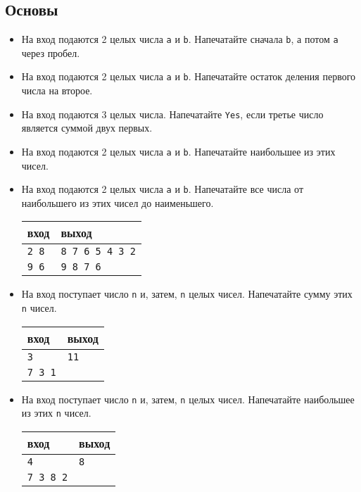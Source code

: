 \documentclass{article}
\begin{document}
\subsection*{Основы}
\begin{itemize}
\item На вход подаются 2 целых числа \texttt{a} и \texttt{b}. Напечатайте сначала \texttt{b}, а потом \texttt{a} через пробел.
\item На вход подаются 2 целых числа \texttt{a} и \texttt{b}. Напечатайте остаток деления первого числа на второе.
\item На вход подаются 3 целых числа. Напечатайте \texttt{Yes}, если третье число является суммой двух первых.
\item На вход подаются 2 целых числа \texttt{a} и \texttt{b}. Напечатайте наибольшее из этих чисел.
\item На вход подаются 2 целых числа \texttt{a} и \texttt{b}. Напечатайте все числа от наибольшего из этих чисел до наименьшего.
\begin{center}
\begin{tabular}{ l | l }
 вход & выход \\ \hline
 \texttt{2 8} & \texttt{8 7 6 5 4 3 2}  \\ \hline
 \texttt{9 6} & \texttt{9 8 7 6}  \\ 
\end{tabular}
\end{center}
\item На вход поступает число \texttt{n} и, затем, \texttt{n} целых чисел. Напечатайте сумму этих \texttt{n} чисел.
\begin{center}
\begin{tabular}{ l | l }
 вход & выход \\ \hline
 \texttt{3} & \texttt{11}  \\ 
 \texttt{7 3 1} &  \\ 
\end{tabular}
\end{center}

\item На вход поступает число \texttt{n} и, затем, \texttt{n} целых чисел. Напечатайте наибольшее из этих \texttt{n} чисел.
\begin{center}
\begin{tabular}{ l | l }
 вход & выход \\ \hline
 \texttt{4} & \texttt{8}  \\ 
 \texttt{7 3 8 2} &  \\ 
\end{tabular}
\end{center}


\end{itemize}
\end{document}
